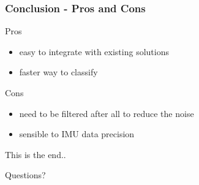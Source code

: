 \documentclass{beamer}
\begin{document}
	\begin{frame}
		\frametitle{Conclusion - Pros and Cons}
		
		\begin{block}{Pros}
			\begin{itemize}
			\item easy to integrate with existing solutions
			\item faster way to classify
			\end{itemize}
		\end{block}		
		
		\begin{block}{Cons}
			\begin{itemize}
			\item need to be filtered after all to reduce the noise
			\item sensible to IMU data precision
			\end{itemize}
		\end{block}
		
	\end{frame}

%			
%
%

	\begin{frame}{This is the end..}
	\begin{alertblock}{}
		\center
		Questions?
	\end{alertblock}
	\end{frame} 	
 	


{} 	
\end{document}
